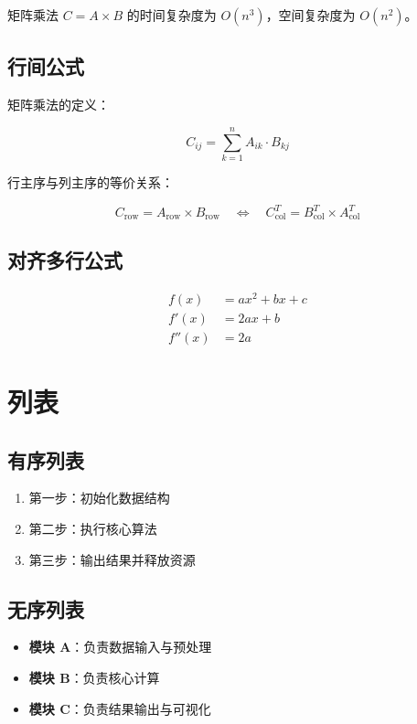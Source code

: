 矩阵乘法 $C = A \times B$ 的时间复杂度为 $O(n^3)$，空间复杂度为 $O(n^2)$。

\subsection{行间公式}

矩阵乘法的定义：

$$
C_{ij} = \sum_{k=1}^{n} A_{ik} \cdot B_{kj}
$$

行主序与列主序的等价关系：

$$
C_{\text{row}} = A_{\text{row}} \times B_{\text{row}} \quad \Longleftrightarrow \quad C_{\text{col}}^T = B_{\text{col}}^T \times A_{\text{col}}^T
$$

\subsection{对齐多行公式}

\begin{align}
    f(x) &= ax^2 + bx + c \\
    f'(x) &= 2ax + b \\
    f''(x) &= 2a
\end{align}

\section{列表}

\subsection{有序列表}

\begin{enumerate}
    \item 第一步：初始化数据结构
    \item 第二步：执行核心算法
    \item 第三步：输出结果并释放资源
\end{enumerate}

\subsection{无序列表}

\begin{itemize}
    \item \textbf{模块 A}：负责数据输入与预处理
    \item \textbf{模块 B}：负责核心计算
    \item \textbf{模块 C}：负责结果输出与可视化
\end{itemize}

